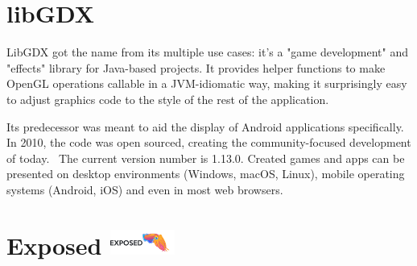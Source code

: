 
\section{libGDX }

LibGDX got the name from its multiple use cases: it's a "game development" and "effects" library for Java-based projects. It provides helper functions to make OpenGL operations callable in a JVM-idiomatic way, making it surprisingly easy to adjust graphics code to the style of the rest of the application.

Its predecessor was meant to aid the display of Android applications specifically. In 2010, the code was open sourced, creating the community-focused development of today.~\cite{LibgdxHistory} The current version number is 1.13.0. Created games and apps can be presented on desktop environments (Windows, macOS, Linux), mobile operating systems (Android, iOS) and even in most web browsers.

\section{Exposed {\hspace{1cm}\includegraphics[height=8mm, keepaspectratio]{images/exposed_logo.png}}}

